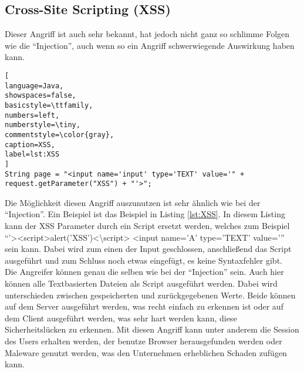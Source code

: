 \subsection{Cross-Site Scripting (XSS)}
Dieser Angriff ist auch sehr bekannt, hat jedoch nicht ganz so schlimme Folgen wie die \enquote{Injection}, auch wenn so ein Angriff schwerwiegende Auswirkung haben kann. \\
\begin{lstlisting}[
language=Java,
showspaces=false,
basicstyle=\ttfamily,
numbers=left,
numberstyle=\tiny,
commentstyle=\color{gray},
caption=XSS,
label=lst:XSS
]
String page = "<input name='input' type='TEXT' value='" + request.getParameter("XSS") + "'>";
\end{lstlisting}
Die Möglichkeit diesen Angriff auszunutzen ist sehr ähnlich wie bei der \enquote{Injection}. Ein Beispiel ist das Beispiel in Listing \ref{lst:XSS}. In diesem Listing kann der XSS Parameter durch ein Script ersetzt werden, welches zum Beispiel \enquote{'><script>alert('XSS')<\textbackslash script> <input name='A' type='TEXT' value='} sein kann. Dabei wird zum einen der Input geschlossen, anschließend das Script ausgeführt und zum Schluss noch etwas eingefügt, es keine Syntaxfehler gibt. \\
Die Angreifer können genau die selben wie bei der \enquote{Injection} sein. Auch hier können alle Textbasierten Dateien als Script ausgeführt werden. Dabei wird unterschieden zwischen gespeicherten und zurückgegebenen Werte. Beide können auf dem Server ausgeführt werden, was recht einfach zu erkennen ist oder auf dem Client ausgeführt werden, was sehr hart werden kann, diese Sicherheitslücken zu erkennen. Mit diesen Angriff kann unter anderem die Session des Users erhalten werden, der benutze Browser herausgefunden werden oder Maleware genutzt werden, was den Unternehmen erheblichen Schaden zufügen kann.

